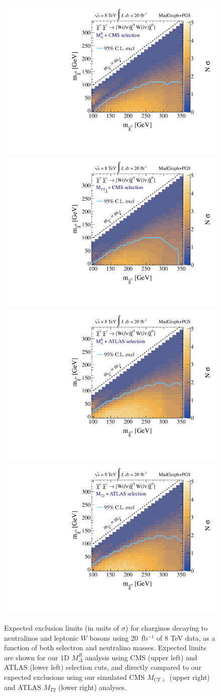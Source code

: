 \begin{figure}[ht]
\includegraphics[width=0.4\columnwidth]{fig/sectionV/LIMIT2D_chargino_CMS_Mdelta.pdf}
\includegraphics[width=0.4\columnwidth]{fig/sectionV/LIMIT2D_chargino_CMS_MCTperp.pdf}
\includegraphics[width=0.4\columnwidth]{fig/sectionV/LIMIT2D_chargino_ATLAS_Mdelta.pdf}
\includegraphics[width=0.4\columnwidth]{fig/sectionV/LIMIT2D_chargino_ATLAS_MT2.pdf}
\caption{Expected exclusion limits (in units of $\sigma$) for charginos decaying to neutralinos and leptonic $W$ bosons using 20~fb$^{-1}$ of 8 TeV data, as a function of both selectron and neutralino masses. Expected limits are shown for our 1D $M_\Delta^R$ analysis using CMS (upper left) and ATLAS (lower left) selection cuts, and directly compared to our expected exclusions using our simulated CMS $M_{CT\perp}$ (upper right) and ATLAS $M_{T2}$ (lower right) analyses.  \label{fig:results_chargino_2D_compare}}
\end{figure}

